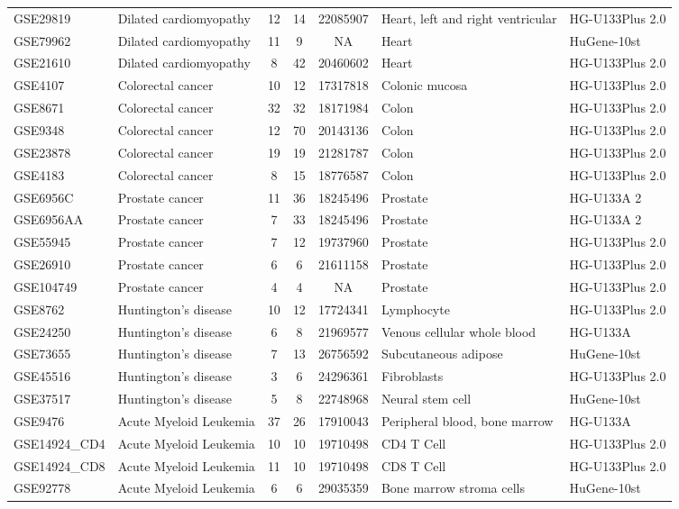 \begin{landscape}
\begin{longtable}{lp{4cm}cccp{4cm}l}
GSE29819	&Dilated cardiomyopathy	&12	&14	&22085907	&Heart, left and right ventricular	&HG-U133Plus 2.0\\
GSE79962	&Dilated cardiomyopathy	&11	&9	&NA	&Heart	&HuGene-10st\\
GSE21610	&Dilated cardiomyopathy	&8	&42	&20460602	&Heart	&HG-U133Plus 2.0\\
GSE4107	&Colorectal cancer	&10	&12	&17317818	&Colonic mucosa	&HG-U133Plus 2.0\\
GSE8671	&Colorectal cancer	&32	&32	&18171984	&Colon	&HG-U133Plus 2.0\\
GSE9348	&Colorectal cancer	&12	&70	&20143136	&Colon	&HG-U133Plus 2.0\\
GSE23878	&Colorectal cancer	&19	&19	&21281787	&Colon	&HG-U133Plus 2.0\\
GSE4183	&Colorectal cancer	&8	&15	&18776587	&Colon	&HG-U133Plus 2.0\\
GSE6956C	&Prostate cancer	&11	&36	&18245496	&Prostate	&HG-U133A 2\\
GSE6956AA	&Prostate cancer	&7	&33	&18245496	&Prostate	&HG-U133A 2\\
GSE55945	&Prostate cancer	&7	&12	&19737960	&Prostate	&HG-U133Plus 2.0\\
GSE26910	&Prostate cancer	&6	&6	&21611158	&Prostate	&HG-U133Plus 2.0\\
GSE104749	&Prostate cancer	&4	&4	&NA	&Prostate	&HG-U133Plus 2.0\\
GSE8762	&Huntington’s disease	&10	&12	&17724341	&Lymphocyte	&HG-U133Plus 2.0\\
GSE24250	&Huntington’s disease	&6	&8	&21969577	&Venous cellular whole blood	&HG-U133A\\
GSE73655	&Huntington’s disease	&7	&13	&26756592	&Subcutaneous adipose	&HuGene-10st\\
GSE45516	&Huntington’s disease	&3	&6	&24296361	&Fibroblasts	&HG-U133Plus 2.0\\
GSE37517	&Huntington’s disease	&5	&8	&22748968	&Neural stem cell	&HuGene-10st\\
GSE9476	&Acute Myeloid Leukemia	&37	&26	&17910043	&Peripheral blood, bone marrow	&HG-U133A\\
GSE14924\_CD4	&Acute Myeloid Leukemia&	10	&10	&19710498	&CD4 T Cell	&HG-U133Plus 2.0\\
GSE14924\_CD8	&Acute Myeloid Leukemia		&11	&10	&19710498	&CD8 T Cell	&HG-U133Plus 2.0\\
GSE92778	&Acute Myeloid Leukemia	&6	&6	&29035359	&Bone marrow stroma cells	&HuGene-10st\\

\end{longtable}
\end{landscape}
